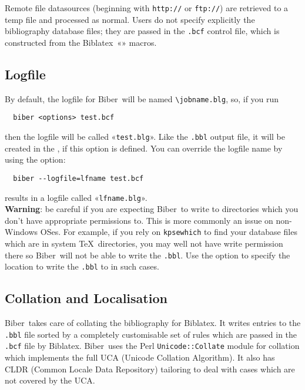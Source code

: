 \documentclass{ltxdockit}
\newcommand*{\biber}{Biber\xspace}
\newcommand*{\biblatex}{Biblatex\xspace}
\begin{document}
\noindent Remote file datasources (beginning with \verb+http://+ or
\verb+ftp://+) are retrieved to a temp file and processed as normal. Users
do not specify explicitly the bibliography database files; they are passed
in the \verb+.bcf+ control file, which is constructed from the
\biblatex\ «\verb++» macros.

\subsection{Logfile}

By default, the logfile for \biber\ will be named \verb+\jobname.blg+,
so, if you run

\begin{verbatim}
  biber <options> test.bcf
\end{verbatim}

\noindent then the logfile will be called «\verb+test.blg+». Like the
\verb+.bbl+ output file, it will be created in the
, if this option is defined. You can
override the logfile name by using the  option:

\begin{verbatim}
  biber --logfile=lfname test.bcf
\end{verbatim}

\noindent results in a logfile called «\verb+lfname.blg+».\\

\noindent \textbf{Warning}: be careful if you are expecting \biber\ to
write to directories which you don't have appropriate permissions to. This
is more commonly an issue on non-Windows OSes. For example, if you rely on
\verb+kpsewhich+ to find your database files which are in system \TeX\
directories, you may well not have write permission there so \biber\
will not be able to write the \verb+.bbl+. Use the 
option to specify the location to write the \verb+.bbl+ to in such cases.

\subsection{Collation and Localisation}\label{coll}

\biber\ takes care of collating the bibliography for
\biblatex. It writes entries to the \verb+.bbl+ file sorted by a
completely customisable set of rules which are passed in the
\verb+.bcf+ file by \biblatex. \biber\ uses the Perl
\verb+Unicode::Collate+ module for collation which implements the full UCA
(Unicode Collation Algorithm). It also has CLDR (Common Locale Data
Repository) tailoring to deal with cases which are not covered by the
UCA.
\end{document}
